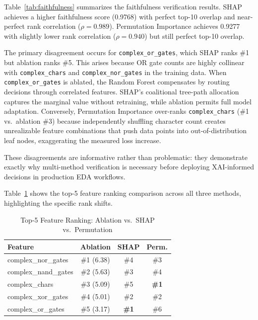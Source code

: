 \documentclass[conference]{IEEEtran}
\begin{document}
Table~\ref{tab:faithfulness} summarizes the faithfulness verification
results. SHAP achieves a higher faithfulness score (0.9768) with perfect
top-10 overlap and near-perfect rank correlation ($\rho = 0.989$). Permutation
Importance achieves 0.9277 with slightly lower rank correlation
($\rho = 0.940$) but still perfect top-10 overlap.

The primary disagreement occurs for \texttt{complex\_or\_gates}, which SHAP
ranks \#1 but ablation ranks \#5. This arises because OR gate counts are
highly collinear with \texttt{complex\_chars} and \texttt{complex\_nor\_gates}
in the training data. When \texttt{complex\_or\_gates} is ablated, the
Random Forest compensates by routing decisions through correlated features.
SHAP's coalitional tree-path allocation captures the marginal value without
retraining, while ablation permits full model adaptation. Conversely,
Permutation Importance over-ranks \texttt{complex\_chars} (\#1 vs.\ ablation
\#3) because independently shuffling character count creates unrealizable
feature combinations that push data points into out-of-distribution leaf
nodes, exaggerating the measured loss increase.

These disagreements are informative rather than problematic: they demonstrate
exactly why multi-method verification is necessary before deploying
XAI-informed decisions in production EDA workflows.

Table~\ref{tab:ranking} shows the top-5 feature ranking comparison across
all three methods, highlighting the specific rank shifts.

\begin{table}[t]
\centering
\caption{Top-5 Feature Ranking: Ablation vs.\ SHAP vs.\ Permutation}
\label{tab:ranking}
\footnotesize
\setlength{\tabcolsep}{2pt}
\begin{tabular}{@{}lccc@{}}
\toprule
\textbf{Feature} & \textbf{Ablation} & \textbf{SHAP} & \textbf{Perm.} \\
\midrule
complex\_nor\_gates  & \#1 (6.38)  & \#4 & \#3 \\
complex\_nand\_gates & \#2 (5.63)  & \#3 & \#4 \\
complex\_chars       & \#3 (5.09)  & \#5 & \textbf{\#1} \\
complex\_xor\_gates  & \#4 (5.01)  & \#2 & \#2 \\
complex\_or\_gates   & \#5 (3.17)  & \textbf{\#1} & \#6 \\
\bottomrule
\end{tabular}
\end{table}
\end{document}

